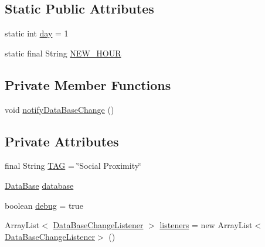 \subsection*{Static Public Attributes}
\begin{DoxyCompactItemize}
\item 
static int \hyperlink{classcom_1_1copelabs_1_1oiframework_1_1socialproximity_1_1_on_social_weight_update_a4f6cce6c6e893845f6f0db6d277e65dd}{day} = 1
\item 
static final String \hyperlink{classcom_1_1copelabs_1_1oiframework_1_1socialproximity_1_1_on_social_weight_update_afdd66acab94bdf2041f5b728d96df31d}{N\+E\+W\+\_\+\+H\+O\+U\+R}
\end{DoxyCompactItemize}
\subsection*{Private Member Functions}
\begin{DoxyCompactItemize}
\item 
void \hyperlink{classcom_1_1copelabs_1_1oiframework_1_1socialproximity_1_1_on_social_weight_update_a18178050f5ad0634bb905ca973b864ae}{notify\+Data\+Base\+Change} ()
\end{DoxyCompactItemize}
\subsection*{Private Attributes}
\begin{DoxyCompactItemize}
\item 
final String \hyperlink{classcom_1_1copelabs_1_1oiframework_1_1socialproximity_1_1_on_social_weight_update_a3bbf5341c4fb269f389aefe1e2ea7349}{T\+A\+G} = \char`\"{}Social Proximity\char`\"{}
\item 
\hyperlink{classcom_1_1copelabs_1_1oiframework_1_1socialproximity_1_1_data_base}{Data\+Base} \hyperlink{classcom_1_1copelabs_1_1oiframework_1_1socialproximity_1_1_on_social_weight_update_aebbc58a65323136459ba7d2bf34aca82}{database}
\item 
boolean \hyperlink{classcom_1_1copelabs_1_1oiframework_1_1socialproximity_1_1_on_social_weight_update_aba463f1549e47893cfeb042f75a82a89}{debug} = true
\item 
Array\+List$<$ \hyperlink{interfacecom_1_1copelabs_1_1oiframework_1_1socialproximity_1_1_data_base_change_listener}{Data\+Base\+Change\+Listener} $>$ \hyperlink{classcom_1_1copelabs_1_1oiframework_1_1socialproximity_1_1_on_social_weight_update_a8f80956e423a5d0548206be93870e412}{listeners} = new Array\+List$<$\hyperlink{interfacecom_1_1copelabs_1_1oiframework_1_1socialproximity_1_1_data_base_change_listener}{Data\+Base\+Change\+Listener}$>$ ()
\end{DoxyCompactItemize}


